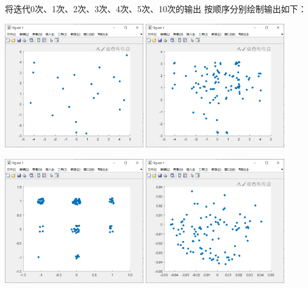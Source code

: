 \documentclass[UTF8]{ctexart}
\begin{document}
将迭代0次、1次、2次、3次、4次、5次、10次的输出
按顺序分别绘制输出如下：

\includegraphics[width = 0.45\textwidth]{test2_01.png}
\includegraphics[width = 0.45\textwidth]{test2_02.png}

\includegraphics[width = 0.45\textwidth]{test2_03.png}
\includegraphics[width = 0.45\textwidth]{test2_04.png}
\end{document}
